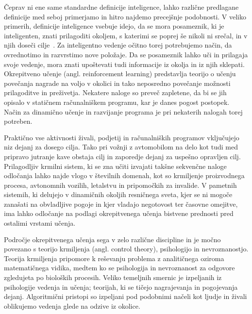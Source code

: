 \documentclass[a4paper, oneside, 12pt]{report}
\begin{document}
Čeprav ni ene same standardne definicije inteligence, lahko različne predlagane definicije med seboj primerjamo in hitro najdemo precejšnje podobnosti. V veliko primerih, definicije inteligence vsebuje idejo, da se mora posameznik, ki je inteligenten, znati prilagoditi okoljem, s katerimi se poprej še nikoli ni srečal, in v njih doseči cilje~\cite{ACollectionOfDefinitionsOfIntelligence}. Za inteligentno vedenje očitno torej potrebujemo način, da ovrednotimo in razvrstimo nove položaje. Da se posameznik lahko uči in prilagaja svoje vedenje, mora znati upoštevati tudi informacije iz okolja in iz njih sklepati. Okrepitveno učenje (angl. reinforcement learning) predstavlja teorijo o učenju povečanja nagrade na voljo v okolici in tako neposredno povečanje možnosti prilagoditve in preživetja. Nekatere naloge so preveč zapletene, da bi se jih opisalo v statičnem računalniškem programu, kar je danes pogost postopek. Način za dinamično učenje in razvijanje programa je pri nekaterih nalogah torej potreben.

Praktično vse aktivnosti živali, podjetij in računalniških programov vključujejo niz dejanj za dosego cilja. Tako pri vožnji z avtomobilom na delo kot tudi med pripravo jutranje kave obstaja cilj in zaporedje dejanj za uspešno opravljen cilj. Prilagodljiv krmilni sistem, ki se zna učiti izvajati takšne sekvenčne naloge odločanja lahko najde vlogo v številnih domenah, kot so krmiljenje proizvodnega procesa, avtonomnih vozilih, letalstvu in pripomočkih za invalide. V pametnih sistemih, ki delujejo v dinamičnih okoljih resničnega sveta, kjer se ni mogoče zanašati na obvladljive pogoje in kjer vladajo negotovost ter časovne omejitve, ima lahko odločanje na podlagi okrepitvenega učenja bistvene prednosti pred ostalimi vrstami učenja.

Področje okrepitvenega učenja sega v zelo različne discipline in je močno povezano s teorijo krmiljenja (angl. control theory), psihologijo in nevroznanostjo. Teorija krmiljenja pripomore k reševanju problema z analitičnega oziroma matematičnega vidika, medtem ko se psihologija in nevroznanost za odgovore zgledujeta po bioloških procesih. Veliko temeljnih smernic je izpeljanih iz psihologije vedenja in učenja; teorijah, ki se tičejo nagrajevanja in pogojevanja dejanj. Algoritmični pristopi so izpeljani pod podobnimi načeli kot ljudje in živali oblikujemo vedenja glede na odzive iz okolice.
\end{document}
